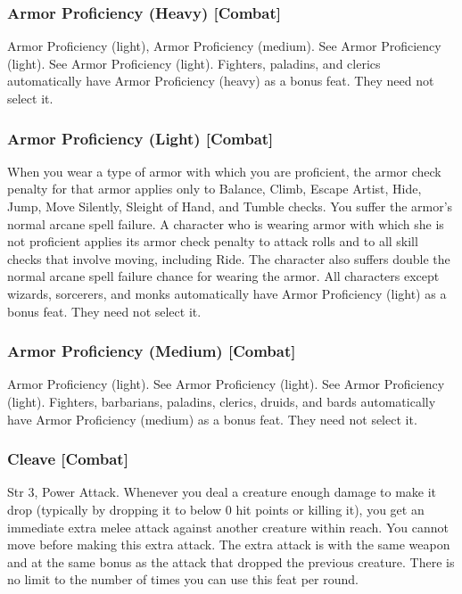 \subsubsection{Armor Proficiency (Heavy) [Combat]}
 Armor Proficiency (light), Armor Proficiency (medium).
 See Armor Proficiency (light).
 See Armor Proficiency (light).
 Fighters, paladins, and clerics automatically have Armor Proficiency (heavy) as a bonus feat. They need not select it.

\subsubsection{Armor Proficiency (Light) [Combat]}
 When you wear a type of armor with which you are proficient, the armor check penalty for that armor applies only to Balance, Climb, Escape Artist, Hide, Jump, Move Silently, Sleight of Hand, and Tumble checks. You suffer the armor's normal arcane spell failure.
 A character who is wearing armor with which she is not proficient applies its armor check penalty to attack rolls and to all skill checks that involve moving, including Ride. The character also suffers double the normal arcane spell failure chance for wearing the armor.
 All characters except wizards, sorcerers, and monks automatically have Armor Proficiency (light) as a bonus feat. They need not select it.

\subsubsection{Armor Proficiency (Medium) [Combat]}
 Armor Proficiency (light).
 See Armor Proficiency (light).
 See Armor Proficiency (light).
 Fighters, barbarians, paladins, clerics, druids, and bards automatically have Armor Proficiency (medium) as a bonus feat. They need not select it.

\subsubsection{Cleave [Combat]}
 Str 3, Power Attack.
 Whenever you deal a creature enough damage to make it drop (typically by dropping it to below 0 hit points or killing it), you get an immediate extra melee attack against another creature within reach. You cannot move before making this extra attack. The extra attack is with the same weapon and at the same bonus as the attack that dropped the previous creature. There is no limit to the number of times you can use this feat per round.

